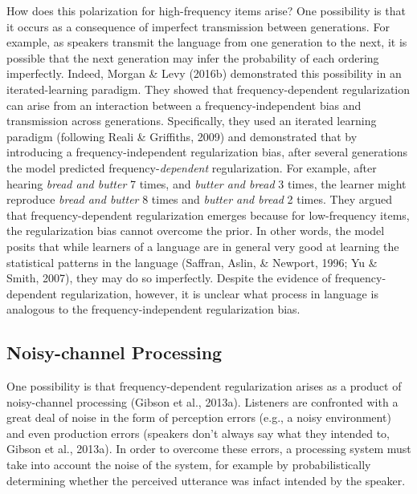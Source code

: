 \documentclass[10pt, letterpaper]{article}
\begin{document}
How does this polarization for high-frequency items arise? One
possibility is that it occurs as a consequence of imperfect transmission
between generations. For example, as speakers transmit the language from
one generation to the next, it is possible that the next generation may
infer the probability of each ordering imperfectly. Indeed, Morgan \&
Levy (2016b) demonstrated this possibility in an iterated-learning
paradigm. They showed that frequency-dependent regularization can arise
from an interaction between a frequency-independent bias and
transmission across generations. Specifically, they used an iterated
learning paradigm (following Reali \& Griffiths, 2009) and demonstrated
that by introducing a frequency-independent regularization bias, after
several generations the model predicted frequency-\emph{dependent}
regularization. For example, after hearing \emph{bread and butter} 7
times, and \emph{butter and bread} 3 times, the learner might reproduce
\emph{bread and butter} 8 times and \emph{butter and bread} 2 times.
They argued that frequency-dependent regularization emerges because for
low-frequency items, the regularization bias cannot overcome the prior.
In other words, the model posits that while learners of a language are
in general very good at learning the statistical patterns in the
language (Saffran, Aslin, \& Newport, 1996; Yu \& Smith, 2007), they may
do so imperfectly. Despite the evidence of frequency-dependent
regularization, however, it is unclear what process in language is
analogous to the frequency-independent regularization bias.

\hypertarget{noisy-channel-processing}{%
\subsection{Noisy-channel Processing}\label{noisy-channel-processing}}

One possibility is that frequency-dependent regularization arises as a
product of noisy-channel processing (Gibson et al., 2013a). Listeners
are confronted with a great deal of noise in the form of perception
errors (e.g., a noisy environment) and even production errors (speakers
don't always say what they intended to, Gibson et al., 2013a). In order
to overcome these errors, a processing system must take into account the
noise of the system, for example by probabilistically determining
whether the perceived utterance was infact intended by the speaker.
\end{document}
